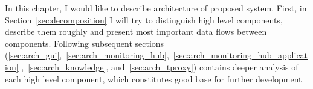 In this chapter, I would like to describe architecture of proposed system. First, in Section~\ref{sec:decomposition} I
will try to distinguish high level components, describe them roughly and present most important data flows between
components. Following subsequent sections
(\ref{sec:arch_gui},~\ref{sec:arch_monitoring_hub},~\ref{sec:arch_monitoring_hub_application}
,~\ref{sec:arch_knowledge}, and~\ref{sec:arch_tproxy}) contains deeper analysis of each high level component, which
constitutes good base for further development













